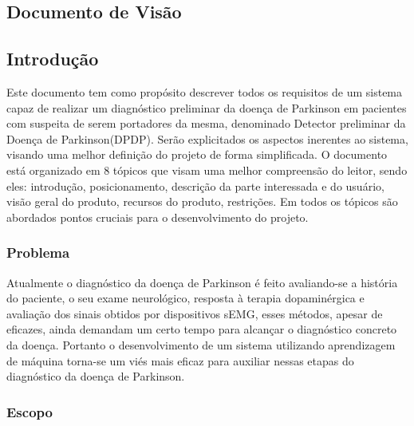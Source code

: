 \begin{anexosenv}


% 

\chapter[Documento de Visão]{Documento de Visão}

\section{Introdução}

Este documento tem como propósito descrever todos os requisitos de um sistema capaz de realizar um diagnóstico preliminar da doença de Parkinson em pacientes com suspeita de serem portadores da mesma, denominado Detector preliminar da Doença de Parkinson(DPDP). Serão explicitados os aspectos inerentes ao sistema, visando uma melhor definição do projeto de forma simplificada. O documento está organizado em 8 tópicos que visam uma melhor compreensão do leitor, sendo eles: introdução, posicionamento, descrição da parte interessada e do usuário, visão geral do produto, recursos do produto, restrições. Em todos os tópicos são abordados pontos cruciais para o desenvolvimento do projeto.

\subsection{Problema}

Atualmente o diagnóstico da doença de Parkinson é feito avaliando-se a história do paciente, o seu exame neurológico, resposta à terapia dopaminérgica e avaliação dos sinais obtidos por dispositivos sEMG, esses métodos, apesar de eficazes, ainda demandam um certo tempo para alcançar o diagnóstico concreto da doença. Portanto o desenvolvimento de um sistema utilizando aprendizagem de máquina torna-se um viés mais eficaz para auxiliar nessas etapas do diagnóstico da doença de Parkinson.

\subsection{Escopo}


\end{anexosenv}
